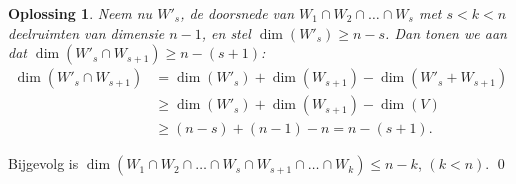 \documentclass[a4paper,12pt]{article}
\newtheorem{oplossing}{Oplossing}
\begin{document}
\begin{enumerate}
\begin{itemize}
\begin{oplossing}
        Neem nu \(W'_s\), de doorsnede van \(W_1 \cap W_2 \cap \dots \cap W_s \) met \(s < k < n\) deelruimten van dimensie \(n-1\), en stel \(\dim(W'_s) \geq n-s\).
        Dan tonen we aan dat \(\dim(W'_s \cap W_{s+1}) \geq n-(s+1)\):
        \begin{align*}
            \dim(W'_s \cap W_{s+1}) 
            &= \dim(W'_s) + \dim (W_{s+1}) - \dim(W'_s + W_{s+1})\\
            &\geq \dim(W'_s) + \dim (W_{s+1}) - \dim(V)\\
            &\geq (n-s) + (n-1) - n = n- (s+1).
        \end{align*}
    \end{oplossing}
    Bijgevolg is \(\dim\left(W_1 \cap W_2 \cap \dots \cap W_s \cap W_{s+1} \cap \dots \cap W_k \right) \leq n-k \), \((k < n)\).
    \qed
\end{itemize}

\vspace{0.5cm}


\end{enumerate}
\end{document}
